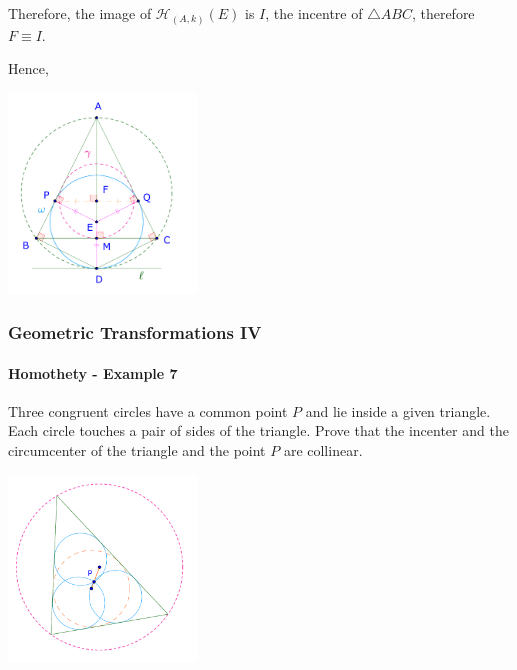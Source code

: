 \documentclass[8pt,xcolor=table,dvipsnames]{beamer}
\begin{document}
\begin{frame}[t]
\begin{overprint}
        Therefore, the image of $\mathcal{H}_{(A,k)}(E)$ is $I$, the incentre of $\triangle ABC$, therefore $F \equiv I.$

        Hence, 
        \begin{center}
            \includegraphics[width=5cm]{./svg/pdf/homothety-p6b.pdf}
        \end{center}
    \end{overprint}
\end{frame}

\begin{frame}[t]
    \frametitle{Geometric Transformations IV}
    \framesubtitle{Homothety - Example 7}
    \begin{example}
        Three congruent circles have a common point $P$ and lie inside a given triangle. Each circle touches a pair of sides of the triangle.
        \bigbreak
        Prove that the incenter and the circumcenter of the triangle and the point $P$ are collinear.
    \end{example}
    \begin{center}
        \includegraphics[width=5cm]{./svg/pdf/homothety-p7a.pdf}
    \end{center}
\end{frame}
\end{document}
